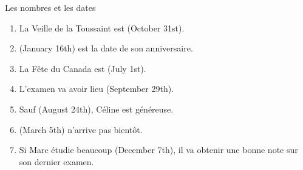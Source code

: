 \begin{frame}{Les nombres et les dates }
  \begin{enumerate}
    \item La Veille de la Toussaint est \underline{} (October 31st).
    \item \underline{} (January 16th) est la date de son anniversaire.
    \item La Fête du Canada est \underline{} (July 1st).
    \item L'examen va avoir lieu \underline{} (September 29th).
    \item Sauf \underline{} (August 24th), Céline est généreuse.
    \item \underline{} (March 5th) n'arrive pas bientôt.
    \item Si Marc étudie beaucoup \underline{} (December 7th), il va obtenir une bonne note sur son dernier examen.
  \end{enumerate}
\end{frame}